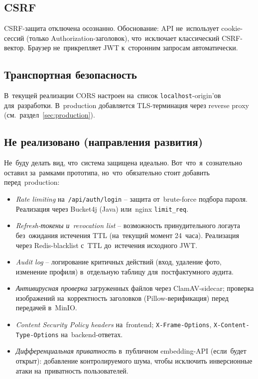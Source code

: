 \documentclass[a4paper,12pt]{diplom}
\begin{document}
\subsection{CSRF}

CSRF-защита отключена осознанно. Обоснование: API не~использует cookie-сессий (только Authorization-заголовок), что~исключает классический CSRF-вектор. Браузер не~прикрепляет JWT к~сторонним запросам автоматически.

\subsection{Транспортная безопасность}

В~текущей реализации CORS настроен на~список \verb|localhost|-origin'ов для~разработки. В~production добавляется TLS-терминация через reverse proxy (см.~раздел~\ref{sec:production}).

\subsection{Не реализовано (направления развития)}

Не~буду делать вид, что~система защищена идеально. Вот~что~я~сознательно оставил за~рамками прототипа, но~что~обязательно стоит добавить перед~production:

\begin{itemize}
\item \emph{Rate limiting} на~\verb|/api/auth/login| -- защита от~brute-force подбора пароля. Реализация через Bucket4j (Java) или~nginx \verb|limit_req|.
\item \emph{Refresh-токены и~revocation list} -- возможность принудительного логаута без~ожидания истечения TTL (на~текущий момент 24~часа). Реализация через Redis-blacklist с~TTL до~истечения исходного JWT.
\item \emph{Audit log} -- логирование критичных действий (вход, удаление фото, изменение профиля) в~отдельную таблицу для~постфактумного аудита.
\item \emph{Антивирусная проверка} загруженных файлов через ClamAV-sidecar; проверка изображений на~корректность заголовков (Pillow-верификация) перед передачей в~MinIO.
\item \emph{Content Security Policy headers} на~frontend; \texttt{X-Frame-Options}, \texttt{X-Content-Type-Options} на~backend-ответах.
\item \emph{Дифференциальная приватность} в~публичном embedding-API (если~будет открыт): добавление контролируемого шума, чтобы исключить инверсионные атаки на~приватность пользователей.
\end{itemize}
\end{document}

